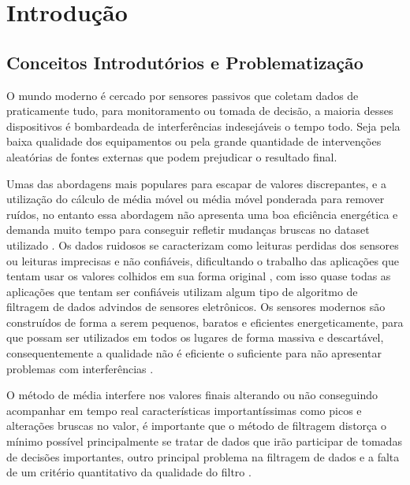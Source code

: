 
\chapter{Introdução}\label{intro}
\section{Conceitos Introdutórios e Problematização}

O mundo moderno é cercado por sensores passivos que coletam dados de praticamente tudo, para monitoramento ou tomada de decisão, a maioria desses dispositivos é bombardeada de interferências indesejáveis o tempo todo. Seja pela baixa qualidade dos equipamentos ou pela grande quantidade de intervenções aleatórias de fontes externas que podem prejudicar o resultado final.

Umas das abordagens mais populares para escapar de valores discrepantes, e a utilização do cálculo de média móvel ou média móvel ponderada para remover ruídos, no entanto essa abordagem não apresenta uma boa eficiência energética e demanda muito tempo para conseguir refletir mudanças bruscas no dataset utilizado \cite{International_Conference__Zhuang}. 
Os dados ruidosos se caracterizam como leituras perdidas dos sensores ou leituras imprecisas e não confiáveis, dificultando o trabalho das aplicações que tentam usar os valores colhidos em sua forma original \cite{Jeffery_Pipelined_Framework}, com isso quase todas as aplicações que tentam ser confiáveis utilizam algum tipo de algoritmo de filtragem de dados advindos de sensores eletrônicos.
Os sensores modernos são construídos de forma a serem pequenos, baratos e eficientes energeticamente, para que possam ser utilizados em todos os lugares de forma massiva e descartável, consequentemente a qualidade não é eficiente o suficiente para não apresentar problemas com interferências \cite{tan2005sensoclean}. 


O método de média interfere nos valores finais alterando ou não conseguindo acompanhar em tempo real características importantíssimas como picos e alterações bruscas no valor, é importante que o método de filtragem distorça o mínimo possível principalmente se tratar de dados que irão participar de tomadas de decisões importantes, outro principal problema na filtragem de dados e a falta de um critério quantitativo da qualidade do filtro \cite{kalambet2011noise}.





